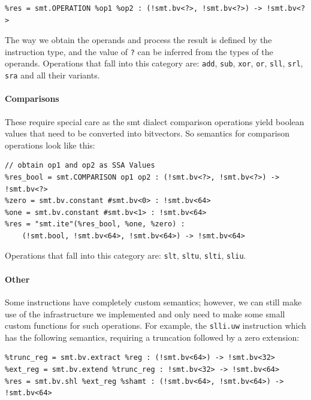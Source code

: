 \begin{verbatim}
%res = smt.OPERATION %op1 %op2 : (!smt.bv<?>, !smt.bv<?>) -> !smt.bv<?>
\end{verbatim}

The way we obtain the operands and process the result is defined by the instruction type, and
the value of \texttt{?} can be inferred from the types of the operands. Operations that fall 
into this category are: \texttt{add}, \texttt{sub}, \texttt{xor}, \texttt{or}, \texttt{sll}, 
\texttt{srl}, \texttt{sra} and all their variants.


\paragraph{Comparisons}

These require special care as the smt dialect comparison operations yield boolean values
that need to be converted into bitvectors. So semantics for comparison operations look like
this:

\begin{verbatim}
// obtain op1 and op2 as SSA Values
%res_bool = smt.COMPARISON op1 op2 : (!smt.bv<?>, !smt.bv<?>) -> !smt.bv<?>
%zero = smt.bv.constant #smt.bv<0> : !smt.bv<64>
%one = smt.bv.constant #smt.bv<1> : !smt.bv<64>
%res = "smt.ite"(%res_bool, %one, %zero) :
    (!smt.bool, !smt.bv<64>, !smt.bv<64>) -> !smt.bv<64>
\end{verbatim}

Operations that fall into this category are: \texttt{slt}, \texttt{sltu}, \texttt{slti}, \texttt{sliu}.


\paragraph{Other}

Some instructions have completely custom semantics; however, we can still make use of the infrastructure
we implemented and only need to make some small custom functions for such operations. 
For example, the \texttt{slli.uw} instruction which has the following semantics, requiring a truncation 
followed by a zero extension:

\begin{verbatim}
%trunc_reg = smt.bv.extract %reg : (!smt.bv<64>) -> !smt.bv<32>
%ext_reg = smt.bv.extend %trunc_reg : !smt.bv<32> -> !smt.bv<64>
%res = smt.bv.shl %ext_reg %shamt : (!smt.bv<64>, !smt.bv<64>) -> !smt.bv<64>
\end{verbatim}

